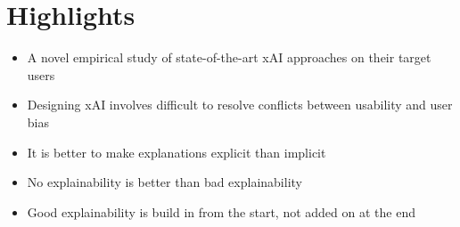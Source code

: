 \section*{\textbf{Highlights}}

\begin{itemize}
    \item A novel empirical study of state-of-the-art xAI approaches on their target users
    \item Designing xAI involves difficult to resolve conflicts between usability and user bias
    \item It is better to make explanations explicit than implicit
    \item No explainability is better than bad explainability
    \item Good explainability is build in from the start, not added on at the end
\end{itemize}
